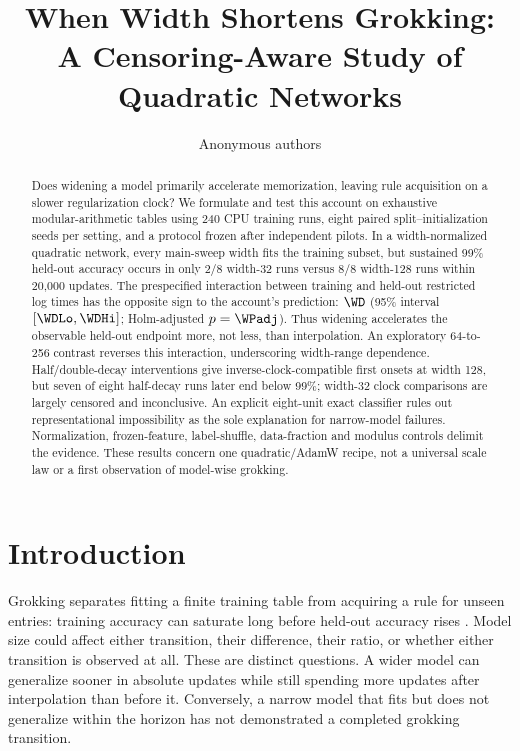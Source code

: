 \documentclass{article}
\title{When Width Shortens Grokking:\\A Censoring-Aware Study of Quadratic Networks}
\author{Anonymous authors}
\begin{document}
\maketitle
\begin{abstract}
Does widening a model primarily accelerate memorization, leaving rule acquisition on a slower regularization clock? We formulate and test this account on exhaustive modular-arithmetic tables using 240 CPU training runs, eight paired split--initialization seeds per setting, and a protocol frozen after independent pilots. In a width-normalized quadratic network, every main-sweep width fits the training subset, but sustained 99\% held-out accuracy occurs in only 2/8 width-32 runs versus 8/8 width-128 runs within 20,000 updates. The prespecified interaction between training and held-out restricted log times has the opposite sign to the account's prediction: $\WD$ (95\% interval $[\WDLo,\WDHi]$; Holm-adjusted $p=\WPadj$). Thus widening accelerates the observable held-out endpoint more, not less, than interpolation. An exploratory 64-to-256 contrast reverses this interaction, underscoring width-range dependence. Half/double-decay interventions give inverse-clock-compatible first onsets at width 128, but seven of eight half-decay runs later end below 99\%; width-32 clock comparisons are largely censored and inconclusive. An explicit eight-unit exact classifier rules out representational impossibility as the sole explanation for narrow-model failures. Normalization, frozen-feature, label-shuffle, data-fraction and modulus controls delimit the evidence. These results concern one quadratic/AdamW recipe, not a universal scale law or a first observation of model-wise grokking.
\end{abstract}

\section{Introduction}
Grokking separates fitting a finite training table from acquiring a rule for unseen entries: training accuracy can saturate long before held-out accuracy rises \citep{power2022}. Model size could affect either transition, their difference, their ratio, or whether either transition is observed at all. These are distinct questions. A wider model can generalize sooner in absolute updates while still spending more updates after interpolation than before it. Conversely, a narrow model that fits but does not generalize within the horizon has not demonstrated a completed grokking transition.
\end{document}
